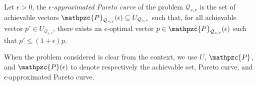 \begin{definition}
  Let $\epsilon > 0$, the \textit{$\epsilon$-approximated Pareto curve} of the \MOSR{} problem $\mathcal{Q}_{s, r}$ is the set of achievable vectors $\mathpzc{P}_{\mathcal{Q}_{s, r}}(\epsilon) \subseteq U_{\mathcal{Q}_{s, r}}$ such that, for all achievable vector $p' \in U_{\mathcal{Q}_{s, r}}$, there exists an $\epsilon$-optimal vector $p \in \mathpzc{P}_{\mathcal{Q}_{s, r}}(\epsilon)$
  such that $p' \leq (1 + \epsilon) p$.
\end{definition}

\begin{notation}
When the \MOSR{} problem considered is clear from the context, we use $U$, $\mathpzc{P}$, and $\mathpzc{P}(\epsilon)$ to denote respectively the achievable set, Pareto curve, and $\epsilon$-approximated Pareto curve.
\end{notation}

